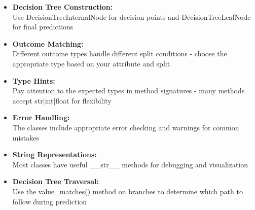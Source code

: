 \documentclass[
english,
smallborders
]{i6prcsht}
\begin{document}
\begin{itemize}
	\item \textbf{Decision Tree Construction:} \\ Use DecisionTreeInternalNode for decision points and DecisionTreeLeafNode for final predictions
	\item \textbf{Outcome Matching:} \\ Different outcome types handle different split conditions - choose the appropriate type based on your attribute and split
	\item \textbf{Type Hints:} \\ Pay attention to the expected types in method signatures - many methods accept str|int|float for flexibility
	\item \textbf{Error Handling:} \\ The classes include appropriate error checking and warnings for common mistakes
	\item \textbf{String Representations:} \\ Most classes have useful \_\_str\_\_ methods for debugging and visualization
	\item \textbf{Decision Tree Traversal:} \\ Use the value\_matches() method on branches to determine which path to follow during prediction
\end{itemize}

\vspace*{0.3cm}
\end{document}
